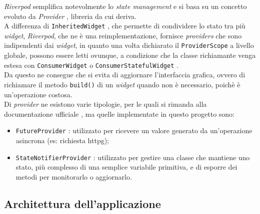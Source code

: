 \emph{Riverpod} semplifica notevolmente lo \emph{state management} e si basa su un concetto evoluto da \emph{Provider} \cite{site:provider}, libreria da cui deriva.\\
A differenza di \lstinline{InheritedWidget} \cite{site:inheritw}, che permette di condividere lo stato tra più \emph{widget}, \emph{Riverpod}, che ne è una reimplementazione, fornisce \emph{providers} che sono indipendenti dai \emph{widget}, in quanto una volta dichiarato il \lstinline{ProviderScope} a livello globale, possono essere letti ovunque, a condizione che la classe richiamante venga estesa con \lstinline{ConsumerWidget} o \lstinline{ConsumerStatefulWidget} \cite{site:reading-provider}. \\
Da questo ne consegue che si evita di aggiornare l'interfaccia grafica, ovvero di richiamare il metodo \lstinline{build()} di un \emph{widget} quando non è necessario, poichè è un'operazione costosa.\\
Di \emph{provider} ne esistono varie tipologie, per le quali si rimanda alla documentazione ufficiale \cite{site:riverpod}, ma quelle implementate in questo progetto sono:
\begin{itemize}
    \item \lstinline{FutureProvider} \cite{site:future-provider}: utilizzato per ricevere un valore generato da un'operazione asincrona (es: richiesta \gls{httpg}\glsoccur);
    \item \lstinline{StateNotifierProvider} \cite{site:state-notifier-provider}: utilizzato per gestire una classe che mantiene uno stato, più complesso di una semplice variabile primitiva, e di esporre dei metodi per monitorarlo o aggiornarlo.
\end{itemize}

\subsection{Architettura dell'applicazione}
\label{subsec:architettura-app}

